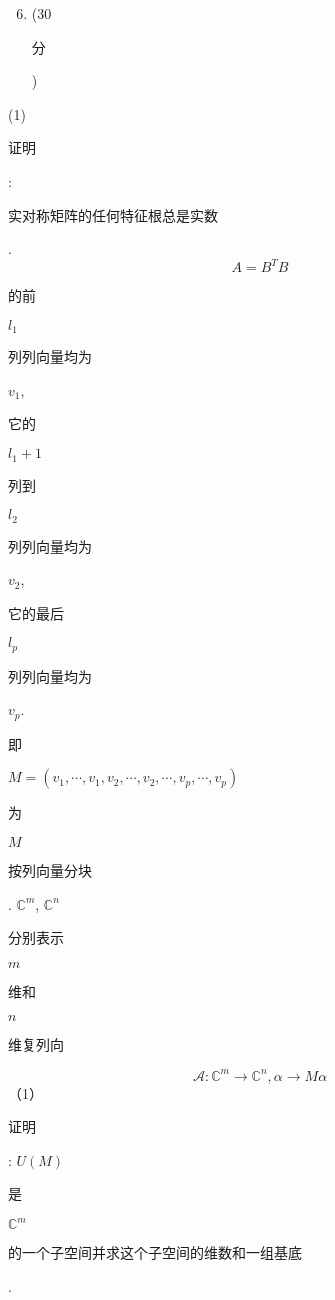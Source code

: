 \documentclass[10pt]{article}
\begin{document}
\begin{enumerate}
  \setcounter{enumi}{5}
  \item (30 \begin{CJK}{UTF8}{mj}分\end{CJK})
\end{enumerate}
(1) \begin{CJK}{UTF8}{mj}证明\end{CJK}: \begin{CJK}{UTF8}{mj}实对称矩阵的任何特征根总是实数\end{CJK}.
$$
A=B^{T} B
$$
\begin{CJK}{UTF8}{mj}的前\end{CJK} $l_{1}$ \begin{CJK}{UTF8}{mj}列列向量均为\end{CJK} $v_{1}$, \begin{CJK}{UTF8}{mj}它的\end{CJK} $l_{1}+1$ \begin{CJK}{UTF8}{mj}列到\end{CJK} $l_{2}$ \begin{CJK}{UTF8}{mj}列列向量均为\end{CJK} $v_{2}$, \begin{CJK}{UTF8}{mj}它的最后\end{CJK} $l_{p}$ \begin{CJK}{UTF8}{mj}列列向量均为\end{CJK} $v_{p}$. \begin{CJK}{UTF8}{mj}即\end{CJK} $M=\left(v_{1}, \cdots, v_{1}, v_{2}, \cdots, v_{2}, \cdots, v_{p}, \cdots, v_{p}\right)$ \begin{CJK}{UTF8}{mj}为\end{CJK} $M$ \begin{CJK}{UTF8}{mj}按列向量分块\end{CJK}. $\mathbb{C}^{m}$, $\mathbb{C}^{n}$ \begin{CJK}{UTF8}{mj}分别表示\end{CJK} $m$ \begin{CJK}{UTF8}{mj}维和\end{CJK} $n$ \begin{CJK}{UTF8}{mj}维复列向\end{CJK}
$$
\mathscr{A}: \mathbb{C}^{m} \rightarrow \mathbb{C}^{n}, \alpha \rightarrow M \alpha
$$
（1）\begin{CJK}{UTF8}{mj}证明\end{CJK}: $U(M)$ \begin{CJK}{UTF8}{mj}是\end{CJK} $\mathbb{C}^{m}$ \begin{CJK}{UTF8}{mj}的一个子空间并求这个子空间的维数和一组基底\end{CJK}.
\end{document}
